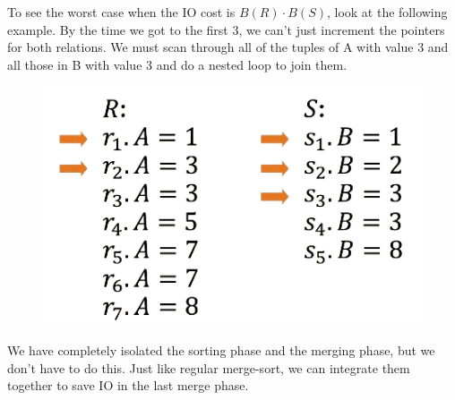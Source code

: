     \begin{example}
      To see the worst case when the IO cost is $B(R) \cdot B(S)$, look at the following example. By the time we got to the first $3$, we can't just increment the pointers for both relations. We must scan through all of the tuples of A with value 3 and all those in B with value 3 and do a nested loop to join them. 
      
      \begin{figure}[H]
        \centering 
        \includegraphics[scale=0.4]{img/nested_loop.png}
        \caption{} 
        \label{fig:nested_loop}
      \end{figure}
    \end{example}

    We have completely isolated the sorting phase and the merging phase, but we don't have to do this. Just like regular merge-sort, we can integrate them together to save IO in the last merge phase. 

